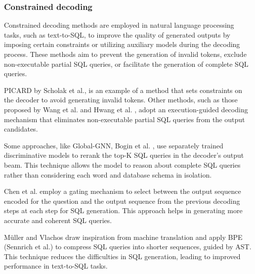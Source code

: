\subsubsection{Constrained decoding}

Constrained decoding methods are employed in natural language processing tasks, such as text-to-SQL, to improve the quality of generated outputs by imposing certain constraints or utilizing auxiliary models during the decoding process. These methods aim to prevent the generation of invalid tokens, exclude non-executable partial SQL queries, or facilitate the generation of complete SQL queries.

PICARD by Scholak et al., \cite{Scholak2021:PICARD} is an example of a method that sets constraints on the decoder to avoid generating invalid tokens. Other methods, such as those proposed by Wang et al. \cite{wang2018robust} and Hwang et al. \cite{DBLP:journals/corr/abs-1902-01069}, adopt an execution-guided decoding mechanism that eliminates non-executable partial SQL queries from the output candidates.

Some approaches, like Global-GNN, Bogin et al. \cite{bogin-etal-2019-global}, use separately trained discriminative models to rerank the top-K SQL queries in the decoder's output beam. This technique allows the model to reason about complete SQL queries rather than considering each word and database schema in isolation.

Chen et al. \cite{chen-etal-2020-tale} employ a gating mechanism to select between the output sequence encoded for the question and the output sequence from the previous decoding steps at each step for SQL generation. This approach helps in generating more accurate and coherent SQL queries.

Müller and Vlachos \cite{müller2019bytepair} draw inspiration from machine translation and apply \ac{BPE} (Sennrich et al.\cite{sennrich-etal-2016-neural}) to compress SQL queries into shorter sequences, guided by AST. This technique reduces the difficulties in SQL generation, leading to improved performance in text-to-SQL tasks.
